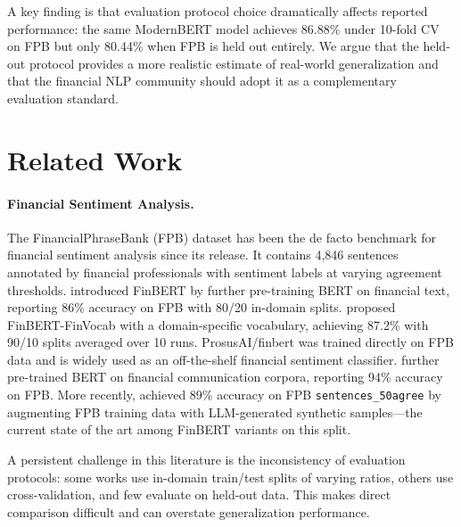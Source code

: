 \documentclass[11pt]{article}
\begin{document}
A key finding is that evaluation protocol choice dramatically affects reported performance: the same ModernBERT model achieves 86.88\% under 10-fold CV on FPB but only 80.44\% when FPB is held out entirely. We argue that the held-out protocol provides a more realistic estimate of real-world generalization and that the financial NLP community should adopt it as a complementary evaluation standard.

\section{Related Work}
\label{sec:related}

\paragraph{Financial Sentiment Analysis.}
The FinancialPhraseBank (FPB) dataset \citep{malo2014good} has been the de facto benchmark for financial sentiment analysis since its release. It contains 4,846 sentences annotated by financial professionals with sentiment labels at varying agreement thresholds. \citet{araci2019finbert} introduced FinBERT by further pre-training BERT on financial text, reporting 86\% accuracy on FPB with 80/20 in-domain splits. \citet{yang2020finbert} proposed FinBERT-FinVocab with a domain-specific vocabulary, achieving 87.2\% with 90/10 splits averaged over 10 runs. ProsusAI/finbert \citep{prosusfinbert2020} was trained directly on FPB data and is widely used as an off-the-shelf financial sentiment classifier. \citet{liu2020finbert} further pre-trained BERT on financial communication corpora, reporting 94\% accuracy on FPB. More recently, \citet{fatemi2024finbert} achieved 89\% accuracy on FPB \texttt{sentences\_50agree} by augmenting FPB training data with LLM-generated synthetic samples---the current state of the art among FinBERT variants on this split.

A persistent challenge in this literature is the inconsistency of evaluation protocols: some works use in-domain train/test splits of varying ratios, others use cross-validation, and few evaluate on held-out data. This makes direct comparison difficult and can overstate generalization performance.
\end{document}

